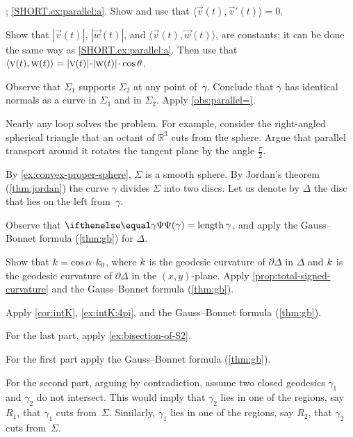 \begin{multicols}{2}
\setcounter{eqtn}{0}

\parbf{\ref{ex:parallel}}; \ref{SHORT.ex:parallel:a}.
Show and use that $\langle\vec v(t),\vec v'(t)\rangle=0$.

\parit{\ref{SHORT.ex:parallel:b}}
Show that $|\vec v(t)|$, $|\vec w(t)|$, and
$\langle\vec v(t),\vec w(t)\rangle$,
are constants; it can be done the same way as \ref{SHORT.ex:parallel:a}.
Then use that 
$\langle\vec v(t),\vec w(t)\rangle\z=|\vec v(t)|\cdot|\vec w(t)|\cdot\cos\theta$.


\setcounter{eqtn}{0}

Observe that $\Sigma_1$ supports $\Sigma_2$ at any point of~$\gamma$.
Conclude that $\gamma$ has identical normals as a curve in $\Sigma_1$ and in $\Sigma_2$.
Apply \ref{obs:parallel=}.

Nearly any loop solves the problem.
For example, consider the right-angled spherical triangle that an octant of $\mathbb{R}^3$ cuts from the sphere.
Argue that parallel transport around it rotates the tangent plane by the angle $\tfrac\pi 2$. 

\setcounter{eqtn}{0}

By \ref{ex:convex-proper-sphere}, $\Sigma$ is a smooth sphere.
By Jordan's theorem (\ref{thm:jordan}) the curve $\gamma$ divides $\Sigma$ into two discs.
Let us denote by $\Delta$ the disc that lies on the left from~$\gamma$.

Observe that $\tgc\gamma=\length\gamma$, and apply the Gauss--Bonnet formula (\ref{thm:gb}) for $\Delta$.

Show that $\skur=\cos\alpha\cdot\skur_0$,
where $k$ is the geodesic curvature of $\partial \Delta$ in $\Delta$
and $k$ is the geodesic curvature of $\partial \Delta$ in the $(x,y)$-plane.
Apply \ref{prop:total-signed-curvature} and the Gauss--Bonnet formula (\ref{thm:gb}).

Apply \ref{cor:intK}, \ref{ex:intK:4pi}, and the Gauss--Bonnet formula (\ref{thm:gb}).

For the last part, apply \ref{ex:bisection-of-S2}.

 For the first part apply the Gauss--Bonnet formula (\ref{thm:gb}).

For the second part, arguing by contradiction, assume two closed geodesics $\gamma_1$ and $\gamma_2$ do not intersect. 
This would imply that $\gamma_2$ lies in one of the regions, say $R_1$, that $\gamma_1$ cuts from~$\Sigma$.
Similarly, $\gamma_1$ lies in one of the regions, say $R_2$, that $\gamma_2$ cuts from~$\Sigma$.


\end{multicols}
